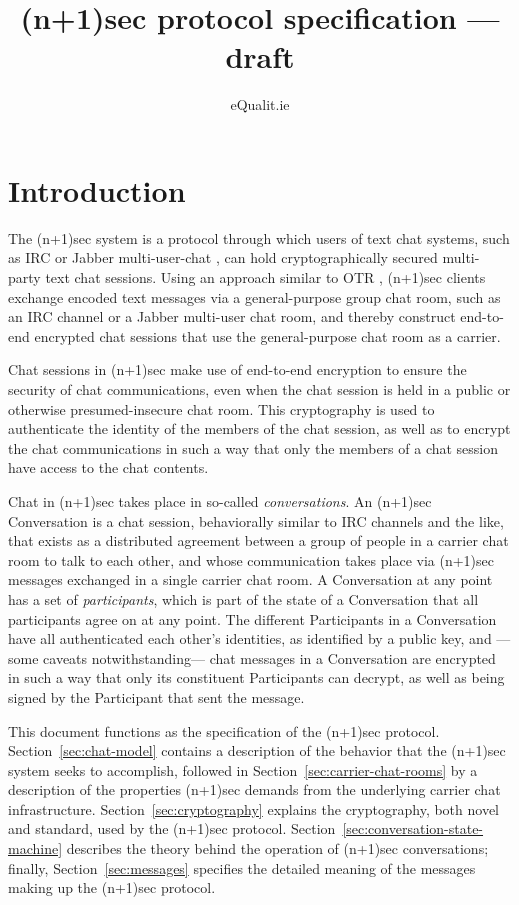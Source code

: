 \documentclass{article}
\title{(n+1)sec protocol specification --- draft}
\author{eQualit.ie}
\begin{document}
\maketitle

\section{Introduction}
\label{sec:introduction}

The (n+1)sec system is a protocol through which users of text chat systems, such as IRC \cite{irc} or Jabber multi-user-chat \cite{jabber}, can hold cryptographically secured multi-party text chat sessions.
Using an approach similar to OTR \cite{otr}, (n+1)sec clients exchange encoded text messages via a general-purpose group chat room, such as an IRC channel or a Jabber multi-user chat room, and thereby construct end-to-end encrypted chat sessions that use the general-purpose chat room as a carrier.

Chat sessions in (n+1)sec make use of end-to-end encryption to ensure the security of chat communications, even when the chat session is held in a public or otherwise presumed-insecure chat room.
This cryptography is used to authenticate the identity of the members of the chat session, as well as to encrypt the chat communications in such a way that only the members of a chat session have access to the chat contents.

Chat in (n+1)sec takes place in so-called \emph{conversations}.
An (n+1)sec Conversation is a chat session, behaviorally similar to IRC channels and the like, that exists as a distributed agreement between a group of people in a carrier chat room to talk to each other, and whose communication takes place via (n+1)sec messages exchanged in a single carrier chat room.
A Conversation at any point has a set of \emph{participants}, which is part of the state of a Conversation that all participants agree on at any point.
The different Participants in a Conversation have all authenticated each other's identities, as identified by a public key, and ---some caveats notwithstanding--- chat messages in a Conversation are encrypted in such a way that only its constituent Participants can decrypt, as well as being signed by the Participant that sent the message.

This document functions as the specification of the (n+1)sec protocol.
Section~\ref{sec:chat-model} contains a description of the behavior that the (n+1)sec system seeks to accomplish, followed in Section~\ref{sec:carrier-chat-rooms} by a description of the properties (n+1)sec demands from the underlying carrier chat infrastructure.
Section~\ref{sec:cryptography} explains the cryptography, both novel and standard, used by the (n+1)sec protocol.
Section~\ref{sec:conversation-state-machine} describes the theory behind the operation of (n+1)sec conversations; finally, Section~\ref{sec:messages} specifies the detailed meaning of the messages making up the (n+1)sec protocol.
\end{document}
